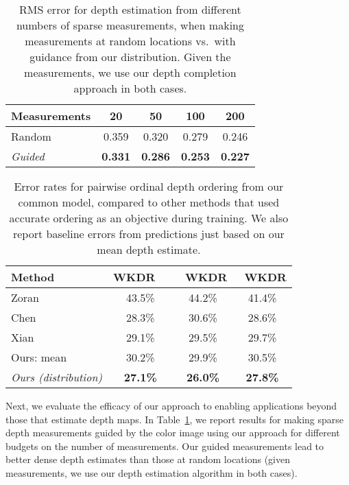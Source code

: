 \documentclass[10pt,twocolumn,letterpaper]{article}
\begin{document}
\begin{table}[!t]
  \begin{center}\small
  \setlength\tabcolsep{10pt}
  \begin{tabular}{lcccc}
    \toprule
    Measurements & 20 & 50 & 100 & 200 \\ \midrule
    Random & 0.359 & 0.320 & 0.279 & 0.246 \\
    \em Guided & \bf 0.331 & \bf 0.286 & \bf 0.253 & \bf 0.227 \\\bottomrule
             
  \end{tabular}
  \end{center}
  \caption{RMS error for depth estimation from different numbers of sparse measurements, when making measurements at random locations vs.\ with guidance from our distribution. Given the measurements, we use our depth completion approach in both cases.}
  \label{tab:opt}
\end{table}
\begin{table}[!t]
  \begin{center}\small
  \setlength\tabcolsep{4pt}
  \begin{tabular}{lccc}
    \toprule
    Method & WKDR~~ & ~WKDR & ~WKDR \\ \toprule
    Zoran \cite{zoran2015learning} & 43.5\% & 44.2\% & 41.4\% \\
    Chen \cite{chen2016single} & 28.3\% & 30.6\% & 28.6\% \\
    Xian \cite{xian2018monocular} & 29.1\% & 29.5\% & 29.7\% \\
    Ours: mean  & 30.2\% & 29.9\% & 30.5\% \\
    \em Ours (distribution) & \bf 27.1\% & \bf 26.0\% & \bf 27.8\% \\ \bottomrule
  \end{tabular}
  \end{center}
  \caption{Error rates for pairwise ordinal depth ordering from our common model, compared to other methods that used accurate ordering as an objective during training. We also report baseline errors from predictions just based on our mean depth estimate.}
  \label{tab:pa}
\end{table}

Next, we evaluate the efficacy of our approach to enabling applications beyond those that estimate depth maps. In Table~\ref{tab:opt}, we report results for making sparse depth measurements guided by the color image using our approach for different budgets on the number of measurements. Our guided measurements lead to better dense depth estimates than those at random locations (given measurements, we use our depth estimation algorithm in both cases).
\end{document}

